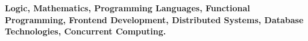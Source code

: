 
\textbf{\small Logic, Mathematics, Programming Languages, 
Functional Programming, Frontend Development, Distributed Systems, 
Database Technologies, Concurrent Computing.}
